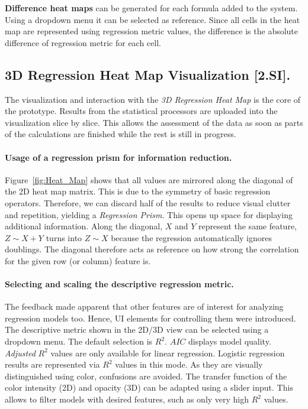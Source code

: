 \documentclass[journal]{style/vgtc} 			          %
\begin{document}
\textbf{Difference heat maps} can be generated for each formula added to the system. %
Using a dropdown menu it can be selected as reference.
Since all cells in the heat map are represented using regression metric values, the difference is the absolute difference of regression metric for each cell.
\subsection{3D Regression Heat Map Visualization [2.SI].}
The visualization and interaction with the \emph{3D Regression Heat Map} is the core of the prototype.
Results from the statistical processors are uploaded into the visualization slice by slice.
This allows the assessment of the data as soon as parts of the calculations are finished while the rest is still in progress.

\paragraph{Usage of a regression prism for information reduction.}
Figure~\ref{fig:Heat_Map} shows that all values are mirrored along the diagonal of the 2D heat map matrix.
This is due to the symmetry of basic regression operators.
Therefore, we can discard half of the results to reduce visual clutter and repetition, yielding a \emph{Regression Prism}.
This opens up space for displaying additional information.
Along the diagonal, $X$ and $Y$ represent the same feature, $Z \sim X + Y$ turns into $Z \sim X$ because the regression automatically ignores doublings.
The diagonal therefore acts as reference on how strong the correlation for the given row (or column) feature is.

\paragraph{Selecting and scaling the descriptive regression metric.}
The feedback made apparent that other features are of interest for analyzing regression models too.
Hence, UI elements for controlling them were introduced.
The descriptive metric shown in the 2D/3D view can be selected using a dropdown menu.
The default selection is $R^2$.
$AIC$ displays model quality.
\emph{Adjusted} $R^2$ values are only available for linear regression.
Logistic regression results are represented via $R^2$ values in this mode.
As they are visually distinguished using color, confusions are avoided.
The transfer function of the color intensity (2D) and opacity (3D) can be adapted using a slider input.
This allows to filter models with desired features, such as only very high $R^2$ values.
\end{document}
